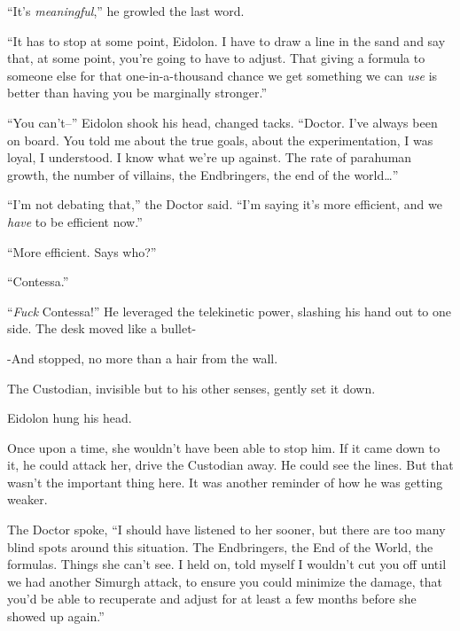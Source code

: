 ``It's \emph{meaningful},'' he growled the last word.



``It has to stop at some point, Eidolon.  I have to draw a line in the sand and say that, at some point, you're going to have to adjust.  That giving a formula to someone else for that one-in-a-thousand chance we get something we can \emph{use} is better than having you be marginally stronger.''



``You can't--'' Eidolon shook his head, changed tacks.  ``Doctor.  I've always been on board.  You told me about the true goals, about the experimentation, I was loyal, I understood.   I know what we're up against.  The rate of parahuman growth, the number of villains, the Endbringers, the end of the world\ldots''



``I'm not debating that,'' the Doctor said.  ``I'm saying it's more efficient, and we \emph{have} to be efficient now.''



``More efficient.  Says who?''



``Contessa.''



``\emph{Fuck} Contessa!''  He leveraged the telekinetic power, slashing his hand out to one side. The desk moved like a bullet-



-And stopped, no more than a hair from the wall.



The Custodian, invisible but to his other senses, gently set it down.



Eidolon hung his head.



Once upon a time, she wouldn't have been able to stop him.  If it came down to it, he could attack her, drive the Custodian away.  He could see the lines.  But that wasn't the important thing here.  It was another reminder of how he was getting weaker.



The Doctor spoke, ``I should have listened to her sooner, but there are too many blind spots around this situation.  The Endbringers, the End of the World, the formulas.  Things she can't see.  I held on, told myself I wouldn't cut you off until we had another Simurgh attack, to ensure you could minimize the damage, that you'd be able to recuperate and adjust for at least a few months before she showed up again.''



